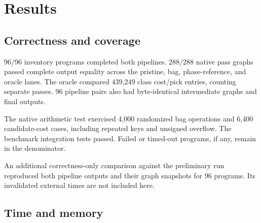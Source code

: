 \section{Results}

\subsection{Correctness and coverage}

96/96 inventory programs completed both pipelines. 288/288 native pass graphs passed complete output equality across the pristine, bag, phase-reference, and oracle lanes. The oracle compared 439,249 class cost/pick entries, counting separate passes. 96 pipeline pairs also had byte-identical intermediate graphs and final outputs.

The native arithmetic test exercised 4,000 randomized bag operations and 6,400 candidate-cost cases, including repeated keys and unsigned overflow. The benchmark integration tests passed. Failed or timed-out programs, if any, remain in the denominator.

An additional correctness-only comparison against the preliminary run reproduced both pipeline outputs and their graph snapshots for 96 programs. Its invalidated external times are not included here.

\subsection{Time and memory}

